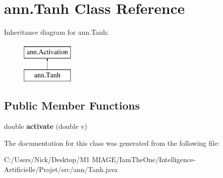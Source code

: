 \hypertarget{classann_1_1_tanh}{}\section{ann.\+Tanh Class Reference}
\label{classann_1_1_tanh}
Inheritance diagram for ann.\+Tanh\+:\begin{figure}[H]
\begin{center}
\leavevmode
\includegraphics[height=2.000000cm]{classann_1_1_tanh}
\end{center}
\end{figure}
\subsection*{Public Member Functions}
\begin{DoxyCompactItemize}
\item 
\mbox{\label{classann_1_1_tanh_a652b75e98b7ad29e16af82769df6b171}} 
double {\bfseries activate} (double v)
\end{DoxyCompactItemize}


The documentation for this class was generated from the following file\+:\begin{DoxyCompactItemize}
\item 
C\+:/\+Users/\+Nick/\+Desktop/\+M1 M\+I\+A\+G\+E/\+Iam\+The\+One/\+Intelligence-\/\+Artificielle/\+Projet/src/ann/Tanh.\+java\end{DoxyCompactItemize}
